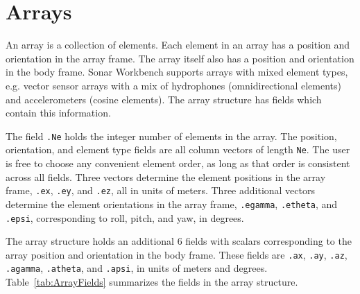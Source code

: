 \section{Arrays}\label{sec:array}

An array is a collection of elements. Each element in an array has a position and orientation in the array frame. The array itself also has a position and orientation in the body frame. Sonar Workbench supports arrays with mixed element types, e.g. vector sensor arrays with a mix of hydrophones (omnidirectional elements) and accelerometers (cosine elements). The array structure has fields which contain this information.

The field \texttt{.Ne} holds the integer number of elements in the array. The position, orientation, and element type fields are all column vectors of length \texttt{Ne}. The user is free to choose any convenient element order, as long as that order is consistent across all fields. Three vectors determine the element positions in the array frame, \texttt{.ex}, \texttt{.ey}, and \texttt{.ez}, all in units of meters. Three additional vectors determine the element orientations in the array frame, \texttt{.egamma}, \texttt{.etheta}, and \texttt{.epsi}, corresponding to roll, pitch, and yaw, in degrees.

The array structure holds an additional 6 fields with scalars corresponding to the array position and orientation in the body frame. These fields are \texttt{.ax}, \texttt{.ay}, \texttt{.az}, \texttt{.agamma}, \texttt{.atheta}, and \texttt{.apsi}, in units of meters and degrees. Table~\ref{tab:ArrayFields} summarizes the fields in the array structure. 

